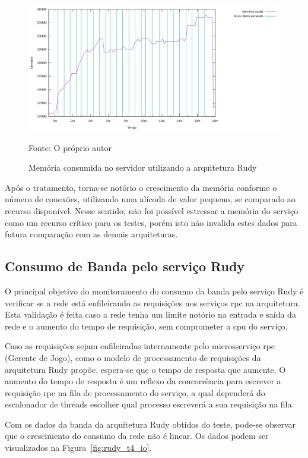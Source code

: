 \begin{figure}[htb!]
    \caption{Memória consumida no servidor utilizando a arquitetura Rudy}
    \label{fig:rudy_t4_memory_used}
    \includegraphics[width=\textwidth]{metricas_rudy_t4/memory_used.png}
    \centering
    
    Fonte: O próprio autor
\end{figure}

Após o tratamento, torna-se notório o crescimento da memória conforme o número de conexões, utilizando uma alícoda de valor pequeno, se comparado ao recurso disponível.
%
Nesse sentido, não foi possível estressar a memória do serviço como um recurso crítico para os testes, porém isto não invalida estes dados para futura comparação com as demais arquiteturas.

\subsection{Consumo de Banda pelo serviço Rudy}

O principal objetivo do monitoramento do consumo da banda pelo serviço Rudy é verificar se a rede está enfileirando as requisições nos serviços \ac{rpc} na arquitetura.
%
Esta validação é feita caso a rede tenha um limite notório na entrada e saída da rede e o aumento do tempo de requisição, sem comprometer a \ac{cpu} do serviço.

Caso as requisições sejam enfileiradas internamente pelo microsserviço \ac{rpc} (Gerente de Jogo), como o modelo de processamento de requisições da arquitetura Rudy propõe, espera-se que o tempo de resposta que aumente.
%
O aumento do tempo de resposta é um reflexo da concorrência para escrever a requisição \ac{rpc} na fila de processamento do serviço, a qual dependerá do escalonador de threads escolher qual processo escreverá a sua requisição na fila.

Com os dados da banda da arquitetura Rudy obtidos do teste, pode-se observar que o crescimento do consumo da rede não é linear.
%
Os dados podem ser visualizados na Figura~\ref{fig:rudy_t4_io}.

